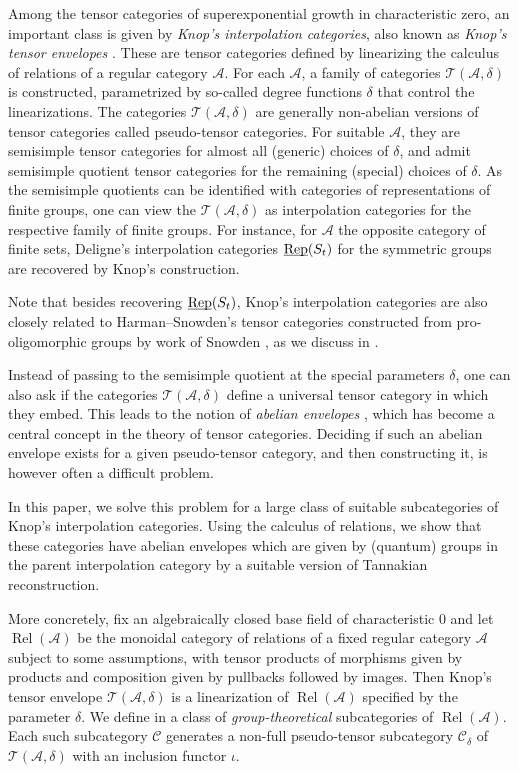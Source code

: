 \documentclass[11pt]{amsart}
\newcommand\Cref[1]{\zcref[S]{#1}}
\theoremstyle{definition}
\theoremstyle{remark}
\newcommand\cA{\mathcal A}
\newcommand\cC{\mathcal C}
\newcommand\cT{\mathcal T}
\newcommand\uRep{\underline{\smash{\operatorname{Rep}}}}
\renewcommand\:\colon
\renewcommand\:\colon
\newcommand\Rel{\operatorname{Rel}}
\begin{document}
Among the tensor categories of superexponential growth in characteristic zero, an important class is given by \emph{Knop's interpolation categories}, also known as \emph{Knop's tensor envelopes} \cite{knop}. These are tensor categories defined by linearizing the calculus of relations of a regular category $\cA$. For each $\cA$, a family of categories $\cT(\cA,\delta)$ is constructed, parametrized by so-called degree functions $\delta$ that control the linearizations. The categories $\cT(\cA,\delta)$ are generally non-abelian versions of tensor categories called pseudo-tensor categories. For suitable $\cA$, they are semisimple tensor categories for almost all (generic) choices of $\delta$, and admit semisimple quotient tensor categories for the remaining (special) choices of $\delta$. As the semisimple quotients can be identified with categories of representations of finite groups, one can view the $\cT(\cA,\delta)$ as interpolation categories for the respective family of finite groups. For instance, for $\cA$ the opposite category of finite sets, Deligne's interpolation categories $\uRep(S_t)$ for the symmetric groups \cite{deligne2007repst} are recovered by Knop's construction.

Note that besides recovering $\uRep(S_t)$, Knop's interpolation categories are also closely related to Harman--Snowden's tensor categories constructed from pro-oligomorphic groups \cite{oligotensor} by work of Snowden \cite{knoptooligo}, as we discuss in \Cref{ss:oligo}.

Instead of passing to the semisimple quotient at the special parameters $\delta$, one can also ask if the categories $\cT(\cA,\delta)$ define a universal tensor category in which they embed. This leads to the notion of \emph{abelian envelopes} \cites{Cou-abelian,BEO,CEOP,flake2026monoidaladjunctionsabelianenvelopes}, which has become a central concept in the theory of tensor categories. Deciding if such an abelian envelope exists for a given pseudo-tensor category, and then constructing it, is however often a difficult problem.

In this paper, we solve this problem for a large class of suitable subcategories of Knop's interpolation categories. Using the calculus of relations, we show that these categories have abelian envelopes which are given by (quantum) groups in the parent interpolation category by a suitable version of Tannakian reconstruction.

\medskip

More concretely, fix an algebraically closed base field of characteristic $0$ and let $\Rel(\cA)$ be the monoidal category of relations of a fixed regular category $\cA$ subject to some assumptions, with tensor products of morphisms given by products and composition given by pullbacks followed by images. Then Knop's tensor envelope $\cT(\cA,\delta)$ is a linearization of $\Rel(\cA)$ specified by the parameter $\delta$.
We define in \Cref{s:group-theoretical-subcats} a class of \emph{group-theoretical} subcategories of $\Rel(\cA)$. Each such subcategory $\cC$ generates a non-full pseudo-tensor subcategory $\cC_\delta$ of $\cT(\cA,\delta)$ with an inclusion functor $\iota$.
\end{document}
